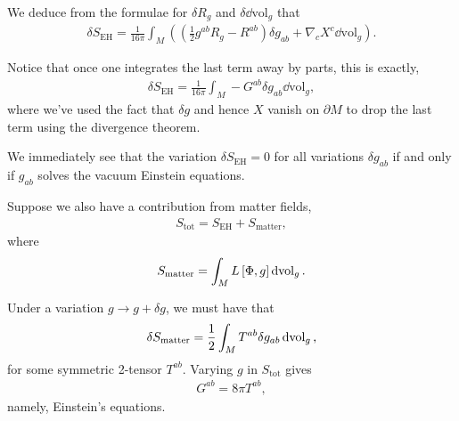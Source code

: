 
We deduce from the formulae for $\delta R_g$ and $\delta \dd{\text{vol}}_{g}$ that
\begin{align}
    \delta S_{\text{EH}} = \frac{1}{16\pi} \int_M \left( \left( \frac{1}{2} g^{ab} R_g - R^{ab}  \right) \delta g_{ab} + \nabla_c X^{c} \dd{\text{vol}}_g \right) 
.\end{align}

Notice that once one integrates the last term away by parts, this is exactly,
\begin{align}
    \delta S_{\text{EH}} = \frac{1}{16\pi} \int_M - G^{ab} \delta g_{ab} \dd{\text{vol}}_g
,\end{align}
where we've used the fact that $\delta g$ and hence $X$ vanish on $\partial M$ to drop the last term using the divergence theorem.

We immediately see that the variation $\delta S_\text{EH} = 0$ for all variations $\delta g_{ab}$ if and only if $g_{ab}$ solves the vacuum Einstein equations.

Suppose we also have a contribution from matter fields,
\begin{align}
    S_\text{tot} = S_{\text{EH}} + S_\text{matter}
,\end{align}
where
\begin{align}
    S_\text{matter} = \int_M L \left[ \Phi, g \right] \dd{\text{vol}}_g
.\end{align}

Under a variation $g \to g + \delta g$, we must have that
\begin{align}
    \delta S_\text{matter} = \frac{1}{2} \int_M T^{ab} \delta g_{ab} \dd{\text{vol}}_g
,\end{align}
for some symmetric 2-tensor $T^{ab}$. Varying $g$ in $S_\text{tot}$ gives
\begin{align}
    G^{ab} = 8 \pi T^{ab}
,\end{align}
namely, Einstein's equations.

